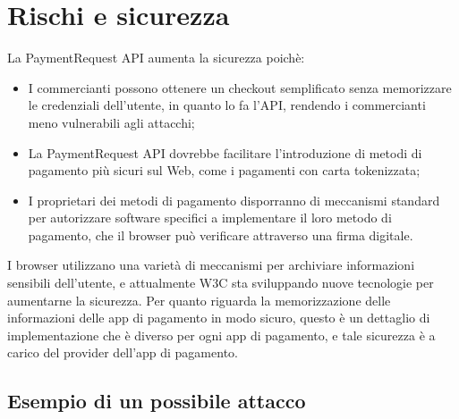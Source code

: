 \documentclass[11pt ,a4paper , twoside , openright ]{article}
\begin{document}
	\section{Rischi e sicurezza}
	La PaymentRequest API aumenta la sicurezza poichè:
	\begin{itemize}
		\item I commercianti possono ottenere un checkout semplificato senza memorizzare le credenziali dell'utente, in quanto lo fa l'API, rendendo i commercianti meno vulnerabili agli attacchi;
		\item La PaymentRequest API dovrebbe facilitare l'introduzione di metodi di pagamento più sicuri sul Web, come i pagamenti con carta tokenizzata;
		\item I proprietari dei metodi di pagamento disporranno di meccanismi standard per autorizzare software specifici a implementare il loro metodo di pagamento, che il browser può verificare attraverso una firma digitale.
	\end{itemize}
	I browser utilizzano una varietà di meccanismi per archiviare informazioni sensibili dell'utente, e attualmente W3C sta sviluppando nuove tecnologie per aumentarne la sicurezza.
	Per quanto riguarda la memorizzazione delle informazioni delle app di pagamento in modo sicuro, questo è un dettaglio di implementazione che è diverso per ogni app di pagamento, e tale sicurezza è a carico del provider dell'app di pagamento.
	
	\subsection{Esempio di un possibile attacco}
\end{document}
